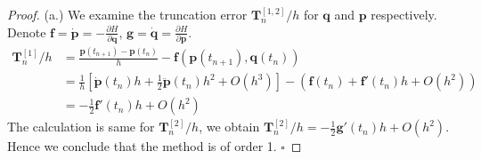 \documentclass[a4paper, 10pt]{article}
\theoremstyle{definition}
\theoremstyle{hSol}
\begin{document}
\begin{proof} (a.) We examine the truncation error $\bm{T}_n^{[1,2]} / h$ for $\bm{q}$ and $\bm{p}$ respectively. Denote $\bm{f} = \dot{\bm{p}} = -\frac{\partial H}{\partial \bm{q}}$, $\bm{g} = \dot{\bm{q}} = \frac{\partial H}{\partial \bm{p}}$. 
\begin{equation}
  \begin{split}
    \bm{T}_n^{[1]} / h &= \frac{\bm{p}(t_{n+1}) - \bm{p}(t_n)}{h} - \bm{f}(\bm{p}(t_{n+1}), \bm{q}(t_n)) \\
    & = \tfrac{1}{h}[\dot{\bm{p}}(t_n)h + \tfrac{1}{2}\ddot{\bm{p}}(t_n)h^2 + O(h^3)] - (\bm{f}(t_n) + \bm{f}'(t_n)h + O(h^2)) \\
    &= -\tfrac{1}{2}\bm{f}'(t_n)h + O(h^2)
  \end{split}
\end{equation}
The calculation is same for $\bm{T}_n^{[2]}/h$, we obtain $\bm{T}_n^{[2]}/h = -\tfrac{1}{2}\bm{g}'(t_n)h + O(h^2)$. Hence we conclude that the method is of order 1. $\square$


\end{proof}
\end{document}
